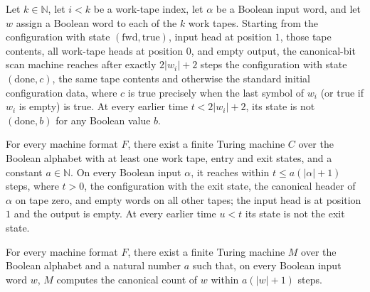 \begin{lemma}
\label{Turing.MachineFormat.canonBitsTM_run}
\leanok
{}
Let $k\in\mathbb{N}$, let $i<k$ be a work-tape index, let $\alpha$ be a Boolean input
word, and let $w$ assign a Boolean word to each of the $k$ work tapes. Starting from the
configuration with state $(\mathrm{fwd},\mathrm{true})$, input head at position $1$,
those tape contents, all work-tape heads at position $0$, and empty output, the
canonical-bit scan machine reaches after exactly $2|w_i|+2$ steps the configuration with
state $(\mathrm{done},c)$, the same tape contents and otherwise the standard initial
configuration data, where $c$ is true precisely when the last symbol of $w_i$ (or true
if $w_i$ is empty) is true. At every earlier time $t<2|w_i|+2$, its state is not
$(\mathrm{done},b)$ for any Boolean value $b$.
\end{lemma}

\begin{lemma}
\label{Turing.MachineFormat.exists_canonHeaderSeam}
\leanok
{}
For every machine format $F$, there exist a finite Turing machine $C$ over the Boolean
alphabet with at least one work tape, entry and exit states, and a constant
$a\in\mathbb N$. On every Boolean input $\alpha$, it reaches within $t\le
a(|\alpha|+1)$ steps, where $t>0$, the configuration with the exit state, the canonical
header of $\alpha$ on tape zero, and empty words on all other tapes; the input head is
at position $1$ and the output is empty. At every earlier time $u<t$ its state is not
the exit state.
\end{lemma}

\begin{lemma}
\label{Turing.MachineFormat.exists_canonCountTM}
\leanok
{}
For every machine format $F$, there exist a finite Turing machine $M$ over the Boolean
alphabet and a natural number $a$ such that, on every Boolean input word $w$, $M$
computes the canonical count of $w$ within $a(|w|+1)$ steps.
\end{lemma}


